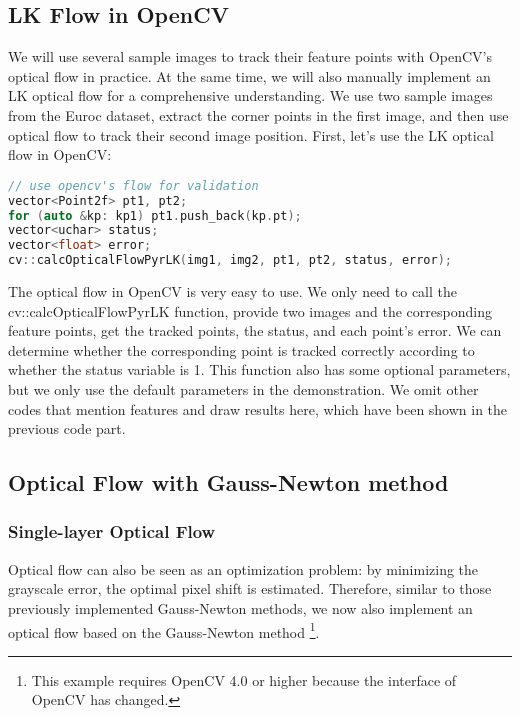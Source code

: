 %
\subsection{LK Flow in OpenCV}
We will use several sample images to track their feature points with OpenCV's optical flow in practice. At the same time, we will also manually implement an LK optical flow for a comprehensive understanding. We use two sample images from the Euroc dataset, extract the corner points in the first image, and then use optical flow to track their second image position. First, let's use the LK optical flow in OpenCV:

\begin{lstlisting}[language=c++,caption=slambook2/ch8/optical_flow.cpp (part))]
// use opencv's flow for validation
vector<Point2f> pt1, pt2;
for (auto &kp: kp1) pt1.push_back(kp.pt);
vector<uchar> status;
vector<float> error;
cv::calcOpticalFlowPyrLK(img1, img2, pt1, pt2, status, error);
\end{lstlisting}

The optical flow in OpenCV is very easy to use. We only need to call the cv::calcOpticalFlowPyrLK function, provide two images and the corresponding feature points, get the tracked points, the status, and each point's error. We can determine whether the corresponding point is tracked correctly according to whether the status variable is 1. This function also has some optional parameters, but we only use the default parameters in the demonstration. We omit other codes that mention features and draw results here, which have been shown in the previous code part.

\subsection{Optical Flow with Gauss-Newton method}
\subsubsection{Single-layer Optical Flow}
Optical flow can also be seen as an optimization problem: by minimizing the grayscale error, the optimal pixel shift is estimated. Therefore, similar to those previously implemented Gauss-Newton methods, we now also implement an optical flow based on the Gauss-Newton method \footnote{This example requires OpenCV 4.0 or higher because the interface of OpenCV has changed.}.

